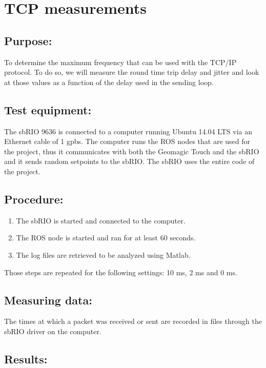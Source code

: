 \section{TCP measurements}\label{sec_tcp_mes}

\subsection*{Purpose:}

To determine the maximum frequency that can be used with the TCP/IP protocol. To do so, we will measure the round time trip delay and jitter and look at those values as a function of the delay used in the sending loop.

\subsection*{Test equipment:}

The sbRIO 9636 is connected to a computer running Ubuntu 14.04 LTS via an Ethernet cable of 1 gpbs. The computer runs the ROS nodes that are used for the project, thus it communicates with both the Geomagic Touch and the sbRIO and it sends random setpoints to the sbRIO. The sbRIO uses the entire code of the project.

\subsection*{Procedure:}

\begin{enumerate}
	\item The sbRIO is started and connected to the computer.
	\item The ROS node is started and ran for at least 60 seconds. 
	\item The log files are retrieved to be analyzed using Matlab.
\end{enumerate}
Those steps are repeated for the following settings: 10 ms, 2 ms and 0 ms.


\subsection*{Measuring data:}

The times at which a packet was received or sent are recorded in files through the sbRIO driver on the computer.

\subsection*{Results:}

